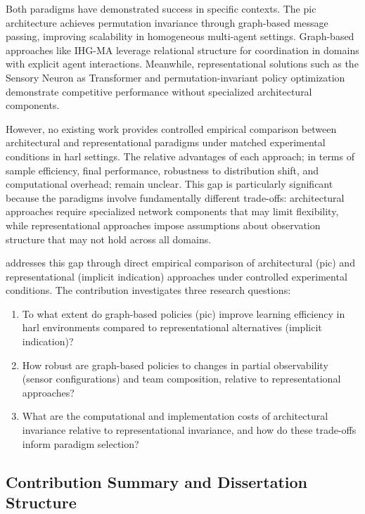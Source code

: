 Both paradigms have demonstrated success in specific contexts. 
The \gls{pic} architecture \cite{liu2020b} achieves permutation 
invariance through graph-based message passing, improving scalability 
in homogeneous multi-agent settings. Graph-based approaches like 
IHG-MA \cite{yang2021a} leverage relational structure for coordination 
in domains with explicit agent interactions. 
Meanwhile, representational solutions such as the Sensory Neuron as 
Transformer \cite{tang2021} and permutation-invariant policy optimization 
\cite{li2021b} demonstrate competitive performance without specialized 
architectural components.

However, no existing work provides controlled empirical comparison 
between architectural and representational paradigms under matched 
experimental conditions in \gls{harl} settings. 
The relative advantages of each approach;
in terms of sample efficiency, final performance, robustness to distribution shift, 
and computational overhead; remain unclear. This gap is particularly 
significant because the paradigms involve fundamentally different trade-offs: 
architectural approaches require specialized network components that may limit
flexibility, while representational approaches impose assumptions about 
observation structure that may not hold across all domains.

\textbf{} addresses this gap through direct empirical 
comparison of architectural (\gls{pic}) and representational 
(implicit indication) approaches under controlled experimental conditions. 
The contribution investigates three research questions:

\begin{enumerate}[label=\textbf{RQ3.\arabic*:}, leftmargin=2.5cm]
    \item To what extent do graph-based policies (\gls{pic}) improve 
    learning efficiency in \gls{harl} environments compared to 
    representational alternatives (implicit indication)?
    \item How robust are graph-based policies to changes in partial observability 
    (sensor configurations) and team composition, relative to representational approaches?
    \item What are the computational and implementation costs of architectural 
    invariance relative to representational invariance, and how do these trade-offs 
    inform paradigm selection?
\end{enumerate}

\subsection{Contribution Summary and Dissertation Structure}
\label{sec:contribution-summary}

